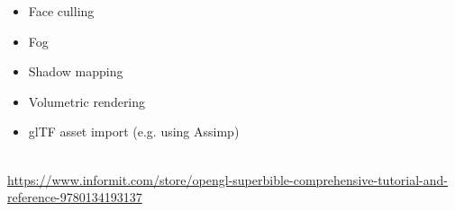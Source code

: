 \documentclass[calcdimensions,landscape,letterpaper]{powersem}
\newcommand{\thecurrentheading}{}
\newcommand{\heading}[1]{\renewcommand{\thecurrentheading}{#1}}
\begin{document}

\begin{slide}
  \heading{Further Topics}
  \begin{center}
    \begin{minipage}[c]{.6\textwidth}
      \begin{itemize}
        \item Face culling
        \item Fog
        \item Shadow mapping
        \item Volumetric rendering
        \item glTF asset import (e.g. using Assimp)
      \end{itemize}
    \end{minipage}
  \end{center}
\end{slide}

\begin{slide}
  \heading{OpenGL Superbible}
  \begin{center}
    \\
    {\small \url{https://www.informit.com/store/opengl-superbible-comprehensive-tutorial-and-reference-9780134193137}}
  \end{center}
\end{slide}
\end{document}
